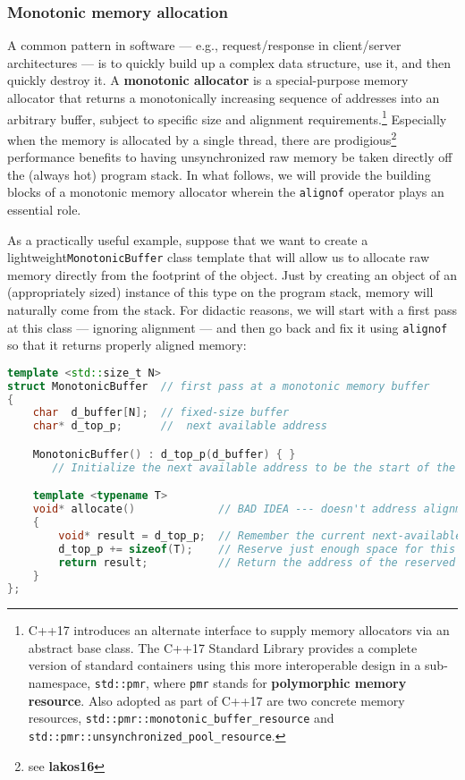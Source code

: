 \subsubsection[Monotonic memory allocation]{Monotonic memory allocation}\label{monotonic-memory-allocation}

A common pattern in software --- e.g., request/response in client/server
architectures --- is to quickly build up a complex data structure,
use it, and then quickly destroy it. A \textbf{monotonic allocator} is
a special-purpose memory allocator that returns a monotonically
increasing sequence of addresses into an arbitrary buffer, subject to
specific size and alignment requirements.{\cprotect\footnote{C++17
introduces an alternate interface to supply memory allocators via an
abstract base class. The C++17 Standard Library provides a complete
version of standard containers using this more interoperable design in
a sub-namespace, \texttt{std::pmr}, where \texttt{pmr} stands for
\textbf{polymorphic memory resource}. Also adopted as part of C++17
are two concrete memory resources,
\texttt{std::pmr::monotonic\_buffer\_resource} and
  \texttt{std::pmr::unsynchronized\_pool\_resource}.}} Especially when
the memory is allocated by a single thread, there are prodigious\footnote{see
\textbf{lakos16}} performance benefits to having unsynchronized raw
memory be taken directly off the (always hot) program stack. In what
follows, we will provide the building blocks of a monotonic memory
allocator wherein the \texttt{alignof} operator plays an essential role.

As a practically useful example, suppose that we want to create a
lightweight\linebreak[4] \mbox{\texttt{MonotonicBuffer}} class template that will allow us
to allocate raw memory directly from the footprint of the object. Just
by creating an object of an (appropriately sized) instance of this type
on the program stack, memory will naturally come from the stack. For
didactic reasons, we will start with a first pass at this class ---
ignoring alignment --- and then go back and fix it using
\texttt{alignof} so that it returns properly aligned memory:

\begin{lstlisting}[language=C++]
template <std::size_t N>
struct MonotonicBuffer  // first pass at a monotonic memory buffer
{
    char  d_buffer[N];  // fixed-size buffer
    char* d_top_p;      //  next available address

    MonotonicBuffer() : d_top_p(d_buffer) { }
       // Initialize the next available address to be the start of the buffer.

    template <typename T>
    void* allocate()             // BAD IDEA --- doesn't address alignment
    {
        void* result = d_top_p;  // Remember the current next-available address.
        d_top_p += sizeof(T);    // Reserve just enough space for this type.
        return result;           // Return the address of the reserved space.
    }
};
\end{lstlisting}
    
